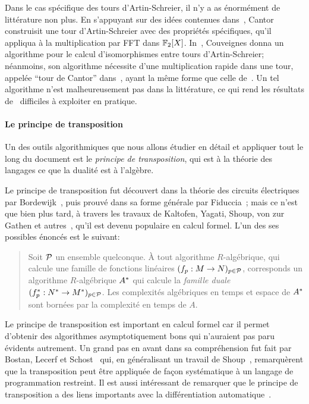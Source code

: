 Dans le cas spécifique des tours d'Artin-Schreier, il n'y a as
énormément de littérature non plus. En s'appuyant sur des idées
contenues dans~\cite{Conway:ONAG2000}, Cantor~\cite{cantor89}
construisit une tour d'Artin-Schreier avec des propriétés spécifiques,
qu'il appliqua à la multiplication par FFT dans
$\mathbb{F}_2[X]$. In~\cite{couveignes00}, Couveignes donna un algorithme pour
le calcul d'isomorphismes entre tours d'Artin-Schreier; néanmoins, son
algorithme nécessite d'une multiplication rapide dans une tour,
appelée ``tour de Cantor'' dans~\cite{couveignes00}, ayant la même
forme que celle de~\cite{cantor89}. Un tel algorithme n'est
malheureusement pas dans la littérature, ce qui rend les résultats
de~\cite{couveignes00} difficiles à exploiter en pratique.

\paragraph*{Le principe de transposition}
Un des outils algorithmiques que nous allons étudier en détail et
appliquer tout le long du document est le \emph{principe de
  transposition}, qui est à la théorie des langages ce que la dualité
est à l'algèbre.

Le principe de transposition fut découvert dans la théorie des
circuits électri\-ques par Bordewijk~\cite{bordewijk57}, puis prouvé
dans sa forme générale par Fiduccia~\cite{fiduccia:phd}; mais ce n'est
que bien plus tard, à travers les travaux de Kaltofen, Yagati, Shoup,
von zur Gathen et
autres~\cite{kaltofen+lakshman89,vzgathen+shoup92,shoup94,shoup95,shoup99,hanrot+quercia+zimmermann},
qu'il est devenu populaire en calcul formel. L'un des ses possibles
énoncés est le suivant:
\begin{quote}
  Soit $\mathcal{P}$ un ensemble quelconque. À tout algorithme
  $R$-algébrique, qui calcule une famille de fonctions linéaires
  $(f_p:M\rightarrow N)_{p\in\mathcal{P}}$, corresponds un algorithme
  $R$-algébrique $A^\ast$ qui calcule la \emph{famille duale}
  $(f^\ast_p:N^\ast\rightarrow M^\ast)_{p\in\mathcal{P}}$. Les complexités
  algébriques en temps et espace de $A^\ast$ sont bornées par la
  complexité en temps de $A$.
\end{quote}

Le principe de transposition est important en calcul formel car il
permet d'obtenir des algorithmes asymptotiquement bons qui n'auraient
pas paru évid\-ents autrement. Un grand pas en avant dans sa
compréhension fut fait par Bostan, Lecerf et
Schost~\cite{bostan+lecerf+schost:tellegen} qui, en généralisant un
travail de Shoup~\cite{shoup95}, remarquèrent que la transposition
peut être appliquée de façon systématique à un langage de
programmation restreint. Il est aussi intéressant de remarquer que le
principe de transposition a des liens importants avec la
différentiation
automatique~\cite{baur+strassen83,kaltofen+lakshman89,Ka2K,gashkov+gashkov05,sergeev08}.

